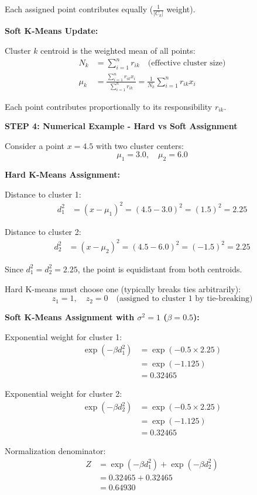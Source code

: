 \documentclass[12pt]{article}
\begin{document}
\begin{solution}
Each assigned point contributes equally ($\frac{1}{|C_k|}$ weight).

\textbf{Soft K-Means Update:}

Cluster $k$ centroid is the weighted mean of all points:
\begin{align*}
N_k &= \sum_{i=1}^n r_{ik} \quad \text{(effective cluster size)} \\
\mu_k &= \frac{\sum_{i=1}^n r_{ik} x_i}{\sum_{i=1}^n r_{ik}} = \frac{1}{N_k} \sum_{i=1}^n r_{ik} x_i
\end{align*}

Each point contributes proportionally to its responsibility $r_{ik}$.

\textbf{STEP 4: Numerical Example - Hard vs Soft Assignment}

Consider a point $x = 4.5$ with two cluster centers:
\[
\mu_1 = 3.0, \quad \mu_2 = 6.0
\]

\textbf{Hard K-Means Assignment:}

Distance to cluster 1:
\begin{align*}
d_1^2 &= (x - \mu_1)^2 = (4.5 - 3.0)^2 = (1.5)^2 = 2.25
\end{align*}

Distance to cluster 2:
\begin{align*}
d_2^2 &= (x - \mu_2)^2 = (4.5 - 6.0)^2 = (-1.5)^2 = 2.25
\end{align*}

Since $d_1^2 = d_2^2 = 2.25$, the point is equidistant from both centroids.

Hard K-means must choose one (typically breaks ties arbitrarily):
\[
z_1 = 1, \quad z_2 = 0 \quad \text{(assigned to cluster 1 by tie-breaking)}
\]

\textbf{Soft K-Means Assignment with $\sigma^2 = 1$ ($\beta = 0.5$):}

Exponential weight for cluster 1:
\begin{align*}
\exp(-\beta d_1^2) &= \exp(-0.5 \times 2.25) \\
&= \exp(-1.125) \\
&= 0.32465
\end{align*}

Exponential weight for cluster 2:
\begin{align*}
\exp(-\beta d_2^2) &= \exp(-0.5 \times 2.25) \\
&= \exp(-1.125) \\
&= 0.32465
\end{align*}

Normalization denominator:
\begin{align*}
Z &= \exp(-\beta d_1^2) + \exp(-\beta d_2^2) \\
&= 0.32465 + 0.32465 \\
&= 0.64930
\end{align*}


\end{solution}
\end{document}
